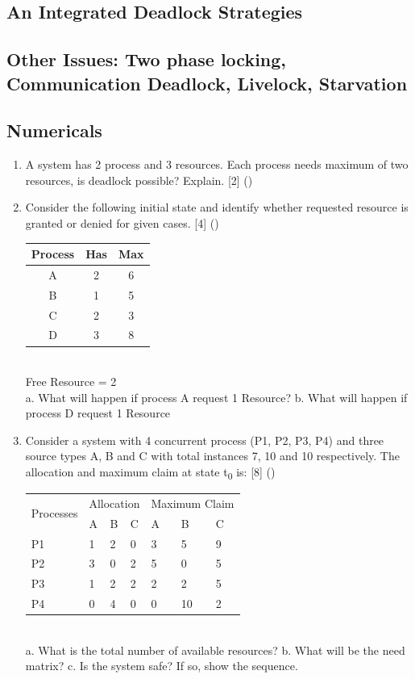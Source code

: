\documentclass[12pt]{article}
\newcommand{\sub}[1]{\textsubscript{#1}}
\begin{document}
	\subsection{An Integrated Deadlock Strategies}
	\subsection{Other Issues: Two phase locking, Communication Deadlock, Livelock, Starvation}
	\subsection{Numericals}
		\begin{enumerate}
			\item A system has 2 process and 3 resources. Each process needs maximum of two resources, is deadlock possible? Explain. \hfill [2] ()

			\item Consider the following initial state and identify whether requested resource is granted or denied for given cases. \hfill [4] ()\\
			\begin{tabular}{|c|c|c|}
				\hline
				Process & Has & Max \\ \hline
				A & 2 & 6 \\ \hline
				B & 1 & 5 \\ \hline
				C & 2 & 3 \\ \hline
				D & 3 & 8 \\ \hline
			\end{tabular}\\
			Free Resource = 2\\
			a. What will happen if process A request 1 Resource?
			b. What will happen if process D request 1 Resource

			\item Consider a system with 4 concurrent process (P1, P2, P3, P4) and three source types A, B and C with total instances 7, 10 and 10 respectively. The allocation and maximum claim at state t\sub{0} is: \hfill [8] ()\\
			\begin{tabular}{|p{17mm}|p{7mm}|p{7mm}|p{7mm}|p{7mm}|p{7mm}|p{7mm}|}
				\hline
				\multirow{2}{*}{Processes} & \multicolumn{3}{|c|}{Allocation} & \multicolumn{3}{|c|}{Maximum Claim} \\ \cline{2-7}
				& A & B & C & A & B & C \\ \hline
				P1 & 1 & 2 & 0 & 3 & 5 & 9 \\ \hline
				P2 & 3 & 0 & 2 & 5 & 0 & 5 \\ \hline
				P3 & 1 & 2 & 2 & 2 & 2 & 5 \\ \hline
				P4 & 0 & 4 & 0 & 0 & 10 & 2 \\ \hline
			\end{tabular}\\
			a. What is the total number of available resources?
			b. What will be the need matrix?
			c. Is the system safe? If so, show the sequence.


\end{enumerate}
\end{document}
